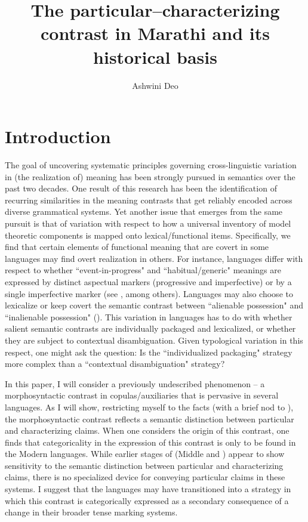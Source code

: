 \documentclass[output=paper,hidelinks]{langscibook}
\title{The particular--characterizing contrast in Marathi and its historical basis}
\author{Ashwini Deo\affiliation{The Ohio State University; The University of Texas at Austin}}
\begin{document}
\maketitle
\renewcommand{\exfont}{\normalfont\itshape}
\section{Introduction}

 The goal of uncovering systematic principles governing cross-linguistic variation in (the realization of) meaning has been strongly pursued in semantics over the past two decades. One result of this research has been the identification of recurring similarities in the meaning contrasts that get reliably encoded across diverse grammatical systems.
 Yet another issue that emerges from the same pursuit is that of variation with respect to how a universal inventory of model theoretic components is mapped onto lexical/functional items. Specifically, we find that certain elements of functional meaning that are covert in some languages may find overt realization in others.
For instance, languages differ with respect to whether ``event-in-progress" and ``habitual/generic" meanings are expressed by distinct aspectual markers (progressive and imperfective) or by a single imperfective marker (see \citealt{bybee-gram1994, comrie76, deo2009c, Deo2015sp}, among others). Languages may also choose to lexicalize or keep covert the semantic contrast between ``alienable possession" and ``inalienable possession" (\citealt{clark1978, aristar1996, Stassen09}). This variation in languages has to do with whether salient semantic contrasts are individually packaged and lexicalized, or whether they are subject to contextual disambiguation. Given typological variation in this respect, one might ask the question: Is the ``individualized packaging" strategy more complex than a ``contextual disambiguation" strategy?

In this paper, I will consider a previously undescribed phenomenon -- a morphosyntactic contrast in copulas/auxiliaries that is pervasive in several  languages. As I will show, restricting myself to the  facts (with a brief nod to ), the morphosyntactic contrast reflects a semantic distinction between particular and characterizing claims. When one considers the origin of this contrast, one finds that categoricality in the expression of this contrast is only to be found in the Modern  languages. While earlier stages of  (Middle and ) appear to show sensitivity to the semantic distinction between particular and characterizing claims, there is no specialized device for conveying particular claims in these systems. I suggest that the  languages may have transitioned into a strategy in which this contrast is categorically expressed as a secondary consequence of a change in their broader tense marking systems.
\end{document}
